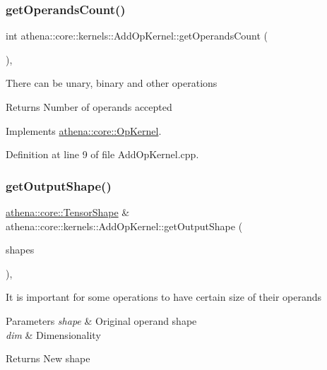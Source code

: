 \subsubsection{\texorpdfstring{get\+Operands\+Count()}{getOperandsCount()}}
{\footnotesize\ttfamily int athena\+::core\+::kernels\+::\+Add\+Op\+Kernel\+::get\+Operands\+Count (\begin{DoxyParamCaption}{ }\end{DoxyParamCaption})\hspace{0.3cm}{\ttfamily [override]}, {\ttfamily [virtual]}}

There can be unary, binary and other operations \begin{DoxyReturn}{Returns}
Number of operands accepted 
\end{DoxyReturn}


Implements \mbox{\hyperlink{classathena_1_1core_1_1_op_kernel_add97d4c132d80ecd9915acfedf7c9119}{athena\+::core\+::\+Op\+Kernel}}.



Definition at line 9 of file Add\+Op\+Kernel.\+cpp.

\mbox{\label{classathena_1_1core_1_1kernels_1_1_add_op_kernel_a687d68d7374e9546f01cefcbfb382d04}} 
\subsubsection{\texorpdfstring{get\+Output\+Shape()}{getOutputShape()}}
{\footnotesize\ttfamily \mbox{\hyperlink{classathena_1_1core_1_1_tensor_shape}{athena\+::core\+::\+Tensor\+Shape}} \& athena\+::core\+::kernels\+::\+Add\+Op\+Kernel\+::get\+Output\+Shape (\begin{DoxyParamCaption}\item[{std\+::vector$<$ \mbox{\hyperlink{classathena_1_1core_1_1_tensor_shape}{athena\+::core\+::\+Tensor\+Shape}} $>$ \&}]{shapes }\end{DoxyParamCaption})\hspace{0.3cm}{\ttfamily [override]}, {\ttfamily [virtual]}}

It is important for some operations to have certain size of their operands 
\begin{DoxyParams}{Parameters}
{\em shape} & Original operand shape \\
\hline
{\em dim} & Dimensionality \\
\hline
\end{DoxyParams}
\begin{DoxyReturn}{Returns}
New shape 
\end{DoxyReturn}


